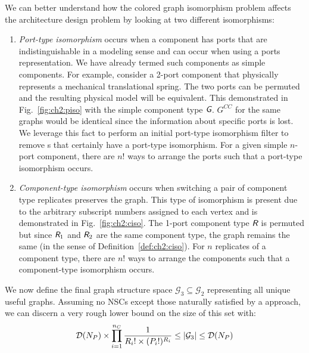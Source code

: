 We can better understand how the colored graph isomorphism problem affects the architecture design problem by looking at two different isomorphisms: 
\begin{enumerate}[label=$\bullet$, widest=$\bullet$, nosep]

\item \textit{Port-type isomorphism} occurs when a component has ports that are indistinguishable in a modeling sense and can occur when using a ports representation. We have already termed such components as simple components. For example, consider a 2-port component that physically represents a mechanical translational spring. The two ports can be permuted and the resulting physical model will be equivalent. This demonstrated in Fig.~\ref{fig:ch2:piso} with the simple component type $\xcolor{G}$. $G^{CC}$ for the same graphs would be identical since the information about specific ports is lost. We leverage this fact to perform an initial port-type isomorphism filter to remove \mypm{}s that certainly have a port-type isomorphism. For a given simple $n$-port component, there are $n!$ ways to arrange the ports such that a port-type isomorphism occurs.



\item \textit{Component-type isomorphism} occurs when switching a pair of component type  replicates preserves the graph. This type of isomorphism is present due to the arbitrary subscript numbers assigned to each vertex and is demonstrated in Fig.~\ref{fig:ch2:ciso}. The 1-port component type $\xcolor{R}$ is permuted but since $\xcolor{R}_1$ and $\xcolor{R}_2$ are the same component type, the graph remains the same (in the sense of Definition~\ref{def:ch2:ciso}). For $n$ replicates of a component type, there are $n!$ ways to arrange the components such that a component-type isomorphism occurs.

\end{enumerate}
We now define the final graph structure space $\mathcal{G}_3 \subseteq \mathcal{G}_2$ representing all unique useful graphs. Assuming no NSCs except those naturally satisfied by a \mypm{} approach, we can discern a very rough lower bound on the size of this set with:
\begin{align}\label{eq:ch2:lowerbnd}
\mathcal{D}(N_P) \times \prod_{i=1}^{n_C} \frac{1}{R_i! \times (P_i!)^{R_i}} \leq \abs*{\mathcal{G}_3} \leq \mathcal{D}(N_P)
\end{align}


